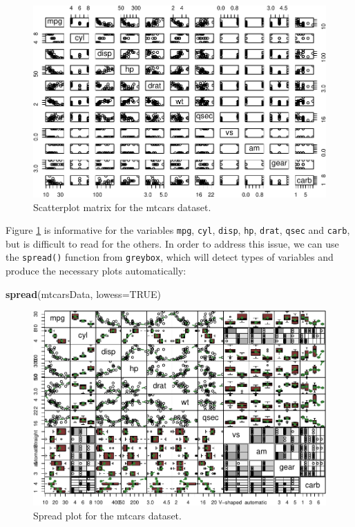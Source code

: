 \documentclass[
]{book}
\newenvironment{Shaded}{\begin{snugshade}}{\end{snugshade}}
\newcommand{\DataTypeTok}[1]{\textcolor[rgb]{0.13,0.29,0.53}{#1}}
\newcommand{\KeywordTok}[1]{\textcolor[rgb]{0.13,0.29,0.53}{\textbf{#1}}}
\newcommand{\NormalTok}[1]{#1}
\newcommand{\OtherTok}[1]{\textcolor[rgb]{0.56,0.35,0.01}{#1}}
\theoremstyle{definition}
\theoremstyle{definition}
\theoremstyle{definition}
\theoremstyle{definition}
\theoremstyle{remark}
\begin{document}
\begin{figure}
\centering
\includegraphics{Svetunkov---Statistics-for-Business-Analytics_files/figure-latex/scatterMatrix-1.pdf}
\caption{\label{fig:scatterMatrix}Scatterplot matrix for the mtcars dataset.}
\end{figure}

Figure \ref{fig:scatterMatrix} is informative for the variables \texttt{mpg}, \texttt{cyl}, \texttt{disp}, \texttt{hp}, \texttt{drat}, \texttt{qsec} and \texttt{carb}, but is difficult to read for the others. In order to address this issue, we can use the \texttt{spread()} function from \texttt{greybox}, which will detect types of variables and produce the necessary plots automatically:

\begin{Shaded}
\begin{Highlighting}[]
\KeywordTok{spread}\NormalTok{(mtcarsData, }\DataTypeTok{lowess=}\OtherTok{TRUE}\NormalTok{)}
\end{Highlighting}
\end{Shaded}

\begin{figure}
\centering
\includegraphics{Svetunkov---Statistics-for-Business-Analytics_files/figure-latex/spreadPlot-1.pdf}
\caption{\label{fig:spreadPlot}Spread plot for the mtcars dataset.}
\end{figure}
\end{document}
